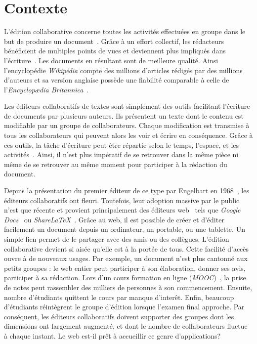 
\section{Contexte}

\lettrine{L}'édition collaborative concerne toutes les activités effectuées en
groupe dans le but de produire un document~\cite{ellis1989concurrency,
  johansen1988groupware}. Grâce à un effort collectif, les rédacteurs
bénéficient de multiples points de vues et deviennent plus impliqués dans
l'écriture~\cite{noel2004empirical}. Les documents en résultant sont de
meilleure qualité. Ainsi l'encyclopédie \emph{Wikipédia} compte des millions
d'articles rédigés par des millions d'auteurs et sa version anglaise possède une
fiabilité comparable à celle de l'\emph{Encyclopædia
  Britannica}~\cite{giles2005internet}.

Les éditeurs collaboratifs de textes sont simplement des outils facilitant
l'écriture de documents par plusieurs auteurs. Ils présentent un texte dont le
contenu est modifiable par un groupe de collaborateurs. Chaque modification est
transmise à tous les collaborateurs qui peuvent alors les voir et écrire en
conséquence. Grâce à ces outils, la tâche d'écriture peut être répartie selon le
temps, l'espace, et les activités~\cite{desanctis1987foundation,
  grudin1994computersupported, johansen1988groupware}. Ainsi, il n'est plus
impératif de se retrouver dans la même pièce ni même de se retrouver au même
moment pour participer à la rédaction du document.

Depuis la présentation du premier éditeur de ce type par Engelbart en
1968~\cite{engelbart1968research}, les éditeurs collaboratifs ont
fleuri. Toutefois, leur adoption massive par le public n'est que récente et
provient principalement des éditeurs web~\cite{mogan2010impact,
  perkel2014scientific} tels que \emph{Google Docs}~\cite{googledocs} ou
\emph{ShareLaTeX}~\cite{sharelatex}. Grâce au web, il est possible de créer et
d'éditer facilement un document depuis un ordinateur, un portable, ou une
tablette. Un simple lien permet de le partager avec des amis ou des
collègues. L'édition collaborative devient si aisée qu'elle est à la portée de
tous. Cette facilité d'accès ouvre à de nouveaux usages. Par exemple, un
document n'est plus cantonné aux petits groupes : le web entier peut participer
à son élaboration, donner ses avis, participer à sa rédaction. Lors d'un cours
formation en ligne (\emph{MOOC})~\cite{breslow2013studying}, la prise de notes
peut rassembler des milliers de personnes à son commencement. Ensuite, nombre
d'étudiants quittent le cours par manque d'interêt. Enfin, beaucoup d'étudiants
réintègrent le groupe d'édition lorsque l'examen final approche.
Par conséquent, les éditeurs collaboratifs doivent supporter des groupes dont
les dimensions ont largement augmenté, et dont le nombre de collaborateurs
fluctue à chaque instant. Le web est-il prêt à accueillir ce genre
d'applications?

